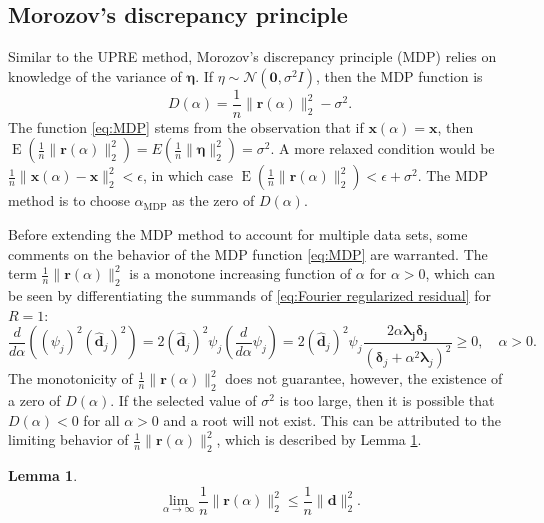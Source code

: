 \documentclass[12pt]{article}
\newcommand{\dVec}{\mathbf{d}}	%
\newcommand{\rVec}{\mathbf{r}}	%
\newcommand{\xVec}{\mathbf{x}}	%
\newcommand{\dft}[1]{\widehat{#1}}	%
\newcommand{\regparam}{\alpha}
\newcommand{\xReg}{\xVec(\regparam)}	%
\newcommand{\mfilt}{\psi}
\newcommand{\noise}{\eta}	%
\newcommand{\noiseSD}{\sigma}	%
\newcommand{\noiseVec}{\bm{\noise}}	%
\DeclareMathOperator{\E}{E}	%
\newcommand{\D}{D}	%
\newcommand{\MDP}{\text{MDP}}	%
\newtheorem{lemma}{Lemma}[section]
\begin{document}
\subsection{Morozov's discrepancy principle} \label{sec:MDP}
Similar to the UPRE method, Morozov's discrepancy principle (MDP) \cite{Morozov1966} relies on knowledge of the variance of $\noiseVec$. If $\noise \sim \mathcal{N}(\bm{0},\noiseSD^2I)$, then the MDP function is 
\begin{equation}
\label{eq:MDP}
\D(\regparam) = \frac{1}{n}\|\rVec(\regparam)\|_2^2 - \noiseSD^2.
\end{equation}
The function \eqref{eq:MDP} stems from the observation that if $\xReg = \xVec$, then $\E(\frac{1}{n}\|\rVec(\regparam)\|_2^2) = E(\frac{1}{n}\|\noiseVec\|_2^2) = \noiseSD^2$. A more relaxed condition would be $\frac{1}{n}\|\xReg - \xVec\|_2^2 < \epsilon$, in which case $\E(\frac{1}{n}\|\rVec(\regparam)\|_2^2) < \epsilon + \noiseSD^2$. The MDP method is to choose $\regparam_{\MDP}$ as the zero of $\D(\regparam)$.  \par 
Before extending the MDP method to account for multiple data sets, some comments on the behavior of the MDP function \eqref{eq:MDP} are warranted. The term $\frac{1}{n}\|\rVec(\regparam)\|_2^2$ is a monotone increasing function of $\regparam$ for $\regparam > 0$, which can be seen by differentiating the summands of \eqref{eq:Fourier regularized residual} for $R = 1$:
\[\frac{d}{d\regparam}\left(\left(\mfilt_j\right)^2\left(\dft{\dVec}_j\right)^2\right) = 2 \left(\dft{\dVec}_j\right)^2 \mfilt_j\left(\frac{d}{d\regparam}\mfilt_j\right) = 2 \left(\dft{\dVec}_j\right)^2 \mfilt_j \frac{2\regparam\bm{\lambda_j}\bm{\delta_j}}{\left(\bm{\delta}_j + \regparam^2 \bm{\lambda}_j\right)^2} \geq 0, \quad \regparam > 0.\]
The monotonicity of $\frac{1}{n}\|\rVec(\regparam)\|_2^2$ does not guarantee, however, the existence of a zero of $\D(\regparam)$. If the selected value of $\noiseSD^2$ is too large, then it is possible that $\D(\regparam) < 0$ for all $\regparam > 0$ and a root will not exist. This can be attributed to the limiting behavior of $\frac{1}{n}\|\rVec(\regparam)\|_2^2$, which is described by Lemma \ref{lem:Residual limit}.
\begin{lemma}
\label{lem:Residual limit}
\[\lim_{\regparam\rightarrow\infty} \frac{1}{n}\|\rVec(\regparam)\|_2^2 \leq \frac{1}{n}\|\dVec\|_2^2.\]
\end{lemma}
\end{document}
